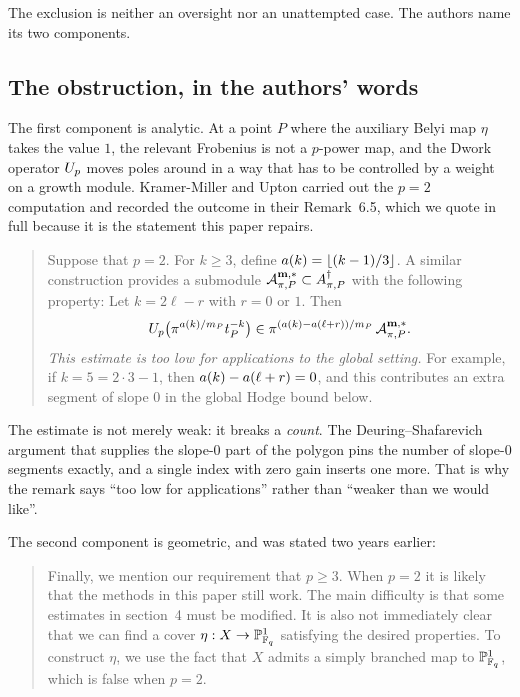The exclusion is neither an oversight nor an unattempted case. The authors
name its two components.

\subsection{The obstruction, in the authors' words}
\label{sec:obstruction}

The first component is analytic. At a point $P$ where the auxiliary Belyi
map $\eta$ takes the value $1$, the relevant Frobenius is not a $p$-power
map, and the Dwork operator $U_p$ moves poles around in a way that has to
be controlled by a weight on a growth module. Kramer-Miller and Upton
carried out the $p = 2$ computation and recorded the outcome in their
Remark~6.5, which we quote in full because it is the statement this paper
repairs.

\begin{quotation}
\noindent
Suppose that $p = 2$. For $k \ge 3$, define $a(k) = \lfloor (k-1)/3
\rfloor$. A similar construction provides a submodule $\mathcal{A}^{\mathbf{m},*}_{\pi,P} \subset
A^{\dagger}_{\pi,P}$ with the following property: Let $k = 2\ell - r$ with
$r = 0$ or $1$. Then
\[
  U_p\bigl(\pi^{a(k)/m_P} t_P^{-k}\bigr) \in
  \pi^{(a(k) - a(\ell + r))/m_P}\, \mathcal{A}^{\mathbf{m},*}_{\pi,P} .
\]
\emph{This estimate is too low for applications to the global setting.} For
example, if $k = 5 = 2\cdot 3 - 1$, then $a(k) - a(\ell+r) = 0$, and
this contributes an extra segment of slope $0$ in the global Hodge bound
below.
\hfill~\cite[Remark~6.5]{kramermillerupton2021newton}
\end{quotation}

The estimate is not merely weak: it breaks a \emph{count}. The
Deuring--Shafarevich argument that supplies the slope-$0$ part of the
polygon pins the number of slope-$0$ segments exactly, and a single index
with zero gain inserts one more. That is why the remark says ``too low for
applications'' rather than ``weaker than we would like''.

The second component is geometric, and was stated two years earlier:

\begin{quotation}
\noindent
Finally, we mention our requirement that $p \ge 3$. When $p = 2$ it is
likely that the methods in this paper still work. The main difficulty is
that some estimates in section~4 must be modified. It is also not
immediately clear that we can find a cover $\eta : X \to \mathbb{P}^1_{\mathbb{F}_q}$
satisfying the desired properties. To construct $\eta$, we use the fact
that $X$ admits a simply branched map to $\mathbb{P}^1_{\mathbb{F}_q}$, which is false when
$p = 2$.
\hfill~\cite[\S1.4]{kramermiller2021padic}
\end{quotation}

